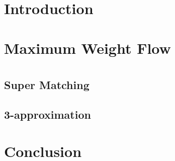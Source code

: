 \begin{abstract}

\end{abstract}

\section{Introduction}


\section{Maximum Weight Flow}


\section{\FIXEDCARPOOL{}}


\section{\UWCARPOOL{}}


\section{\CARPOOL{}}
\label{sec:cm}
	\subsection{Super Matching}
	
	\subsection{3-approximation}
	

\section{Conclusion}
